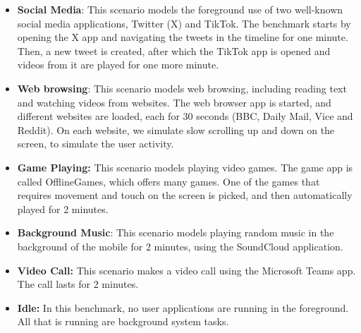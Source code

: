 \documentclass[conference]{IEEEtran}
\begin{document}
    \begin{itemize}
    
\item \textbf{Social Media}: This scenario models the foreground use of two well-known social media applications, Twitter (X) and TikTok. The benchmark starts by opening the X app and navigating the tweets in the timeline for one minute. Then, a new tweet is created, after which the TikTok app is opened and videos from it are played for one more minute.

\item \textbf{Web browsing}: This scenario models web browsing, including reading text and watching videos from websites. The web browser app is started, and different websites are loaded, each for 30 seconds (BBC, Daily Mail, Vice and Reddit). On each website, we simulate slow scrolling up and down on the screen, to simulate the user activity.

\item \textbf{Game Playing:} This scenario models playing video games. The game app is called OfflineGames, which offers many games. One of the games that requires movement and touch on the screen is picked, and then automatically played for 2 minutes.

\item \textbf{Background Music}: This scenario models playing random music in the background of the mobile for 2 minutes, using the SoundCloud application. 

\item \textbf{Video Call:} This scenario makes a video call using the Microsoft Teams app. The call lasts for 2 minutes.

\item \textbf{Idle:} In this benchmark, no user applications are running in the foreground. All that is running are background system tasks. 
\end{itemize}

\noindent
\end{document}
